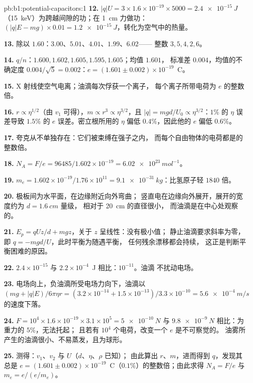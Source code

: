 \begin{solution}{pb:b1:potential-capacitors:1}
\textbf{12.} $|q|U = 3 \times 1.6 \times 10^{-19} \times 5000 = \qty{2.4e-15}{J}$
（\qty{15}{keV}）为跨越间隙的功；在 \qty{1}{cm} 力做功：$(|q|E - mg) \times 0.01 =
\qty{1.2e-15}{J}$，转化为空气中的热量。

\textbf{13.} 除以 $1.60$：$3.00$、$5.01$、$4.01$、$1.99$、$6.02$——
整数 $3, 5, 4, 2, 6$。

\textbf{14.} $q/n$：$1.600, 1.602, 1.605, 1.595, 1.605$；均值 $1.601$，
标准差 $0.004$，均值的不确定度 $0.004/\sqrt5 =
0.002$：$e = (1.601 \pm 0.002) \times 10^{-19}$~C。

\textbf{15.} X 射线使空气电离；油滴每次俘获一个离子，
每个离子所带电荷为 $e$ 的整数倍。

\textbf{16.} $r \propto \eta^{1/2}$（由 $v_1$ 可得），$m \propto r^3 \propto \eta^{3/2}$，且
$|q| = mgd/U_0 \propto \eta^{3/2}$：$1\%$ 的 $\eta$ 误差导致 $1.5\%$ 的 $e$ 误差。密立根所用的
$\eta$ 偏低 $0.4\%$，因此他的 $e$ 偏低 $0.6\%$。

\textbf{17.} 夸克从不单独存在：它们被束缚在强子之内，
而每个自由物体的电荷都是的整数倍。

\textbf{18.} $N_A = F/e = 96485/1.602 \times 10^{-19} = \qty{6.02e23}{mol^{-1}}$。

\textbf{19.} $m_e = 1.602 \times 10^{-19}/1.76 \times 10^{11} = \qty{9.1e-31}{kg}$：比氢原子轻
$1840$ 倍。

\textbf{20.} 极板间为水平面，在边缘附近向外弯曲；
竖直电在边缘向外展开，展开的宽度约为 $d = \qty{1.6}{cm}$ 量级，
相对于 \qty{20}{cm} 的直径很小，
而油滴是在中心处观察的。

\textbf{21.} $E_p = qUz/d + mgz$，关于 $z$ 呈线性：没有极小值；
静止油滴要求斜率为零，即 $q = -mgd/U$，此时平衡为随遇平衡，
任何残余漂移都会持续，
这正是判断平衡困难的原因。

\textbf{22.} $2.4 \times 10^{-15}$ 与 $2.2 \times 10^{-4}$~J 相比：$10^{-11}$。油滴
不扰动电场。

\textbf{23.} 电场向上，负油滴所受电场力向下，油滴以 $(mg
+ |q|E)/6\pi\eta r = (3.2 \times 10^{-14} + 1.5 \times 10^{-13})/3.3 \times 10^{-10} =
\qty{5.6e-4}{m/s}$ 的速度下落。

\textbf{24.} $F = 10^4 \times 1.6 \times 10^{-19} \times 3.1 \times 10^5 = \qty{5e-10}{N}$
与 $\qty{9.8e-9}{N}$ 相比：为重力的 $5\%$，无法托起；
且若有 $10^4$ 个电荷，改变一个 $e$ 是不可察觉的。
油雾所产生的油滴很小、不易蒸发，且为球形。

\textbf{25.} 测得：$v_1$、$v_2$ 与 $U$（$d$、$\eta$、$\rho$ 已知）；
由此算出 $r$、$m$，进而得到 $q$，发现其总是
$e = (1.601 \pm 0.002) \times 10^{-19}$~C（$0.1\%$）的整数倍；由此求得 $N_A = F/e$ 与
$m_e = e/(e/m_e)$。
\end{solution}
